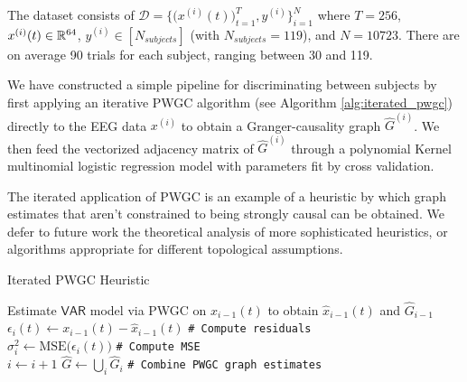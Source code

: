 \documentclass[12pt]{article}
\def\VAR{\mathsf{VAR}}  %
\begin{document}
The dataset consists of
$\mathcal{D} = \{\big(x^{(i)}(t)\big)_{t = 1}^T, y^{(i)} \}_{i = 1}^N$
where $T = 256$, $x^{(i)}(t) \in \mathbb{R}^{64}$,
$y^{(i)} \in [N_{subjects}]$ (with $N_{subjects} = 119$), and
$N = 10723$.  There are on average 90 trials for each subject,
ranging between 30 and 119.

We have constructed a simple pipeline for discriminating between
subjects by first applying an iterative PWGC algorithm (see Algorithm
\ref{alg:iterated_pwgc}) directly to the EEG data $x^{(i)}$ to obtain
a Granger-causality graph $\widehat{G}^{(i)}$.  We then feed the
vectorized adjacency matrix of $\widehat{G}^{(i)}$ through a
polynomial Kernel multinomial logistic regression model with
parameters fit by cross validation.

\begin{remark}
  The iterated application of PWGC is an example of a heuristic by
  which graph estimates that aren't constrained to being strongly
  causal can be obtained.  We defer to future work the theoretical
  analysis of more sophisticated heuristics, or algorithms appropriate
  for different topological assumptions.
\end{remark}

\begin{algorithm}
  \DontPrintSemicolon

  \BlankLine
  \caption{Iterated PWGC Heuristic}
  \label{alg:iterated_pwgc}
  

   {
    Estimate $\VAR$ model via PWGC on $x_{i - 1}(t)$ to obtain $\widehat{x}_{i - 1}(t)$ and $\widehat{G}_{i - 1}$\\
    $\epsilon_i(t) \leftarrow x_{i - 1}(t) - \widehat{x}_{i - 1}(t)$ \texttt{\# Compute residuals}\\
    $\sigma_i^2 \leftarrow \text{MSE}\big(\epsilon_i(t)\big)$ \texttt{\# Compute MSE}\\
    $i \leftarrow i + 1$
  }
  $\widehat{G} \leftarrow \bigcup_{i} \widehat{G}_{i}$ \texttt{\# Combine PWGC graph estimates}\\
\end{algorithm}
\end{document}
